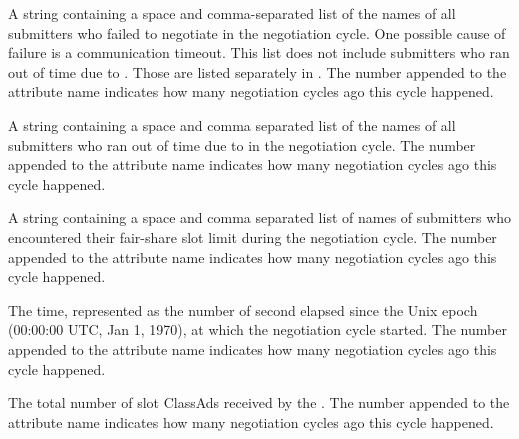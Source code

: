 \begin{description}
\label{attr:LastNegotiationCycleSubmittersFailed<X>}
\item[\AdAttr{LastNegotiationCycleSubmittersFailed<X>}:] A string containing
a space and comma-separated list of the names of all submitters who
failed to negotiate in the negotiation cycle.  One possible cause of
failure is a communication timeout.  This list does not include
submitters who ran out of time due
to .  Those are listed
separately in .
The number  appended to the attribute name indicates how
many negotiation cycles ago this cycle happened.

\label{attr:LastNegotiationCycleSubmittersOutOfTime<X>}
\item[\AdAttr{LastNegotiationCycleSubmittersOutOfTime<X>}:] A string containing
a space and comma separated list of the names of all submitters who
ran out of time due to 
in the negotiation cycle.  The number  appended to the
attribute name indicates how many negotiation cycles ago this cycle
happened.

\label{attr:LastNegotiationCycleSubmittersShareLimit}
\item[\AdAttr{LastNegotiationCycleSubmittersShareLimit}:] 
A string containing a space and comma separated list of names of submitters 
who encountered their fair-share slot limit during the negotiation cycle.  
The number  appended to the attribute name indicates how
many negotiation cycles ago this cycle happened.

\label{attr:LastNegotiationCycleTime<X>}
\item[\AdAttr{LastNegotiationCycleTime<X>}:] 
The time, represented as the number of second elapsed since the Unix
epoch (00:00:00 UTC, Jan 1, 1970), at which the negotiation cycle started.
The number  appended to the attribute name
indicates how many negotiation cycles ago this cycle happened.

\label{attr:LastNegotiationCycleTotalSlots<X>}
\item[\AdAttr{LastNegotiationCycleTotalSlots<X>}:] 
The total number of slot ClassAds received by the .
The number  appended to the attribute name indicates 
how many negotiation cycles ago this cycle happened.


\end{description}
